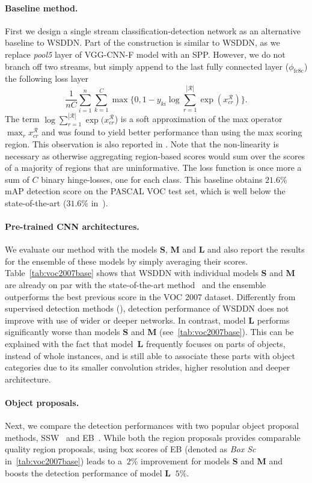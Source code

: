 \paragraph{Baseline method.} First we design a single stream classification-detection network as an alternative baseline to WSDDN. Part of the construction is similar to WSDDN, as we replace \textit{pool5} layer of VGG-CNN-F model with an SPP. However, we do not branch off two streams, but simply append to the last fully connected layer ($\phi_\text{fc8c}$) the following loss layer \[
\frac{1}{nC}
\sum_{i=1}^n
\sum_{k=1}^C
\max\{0, 1 - y_{ki} \log \sum_{r=1}^{|\mathcal{R}|} \exp(x^{\mathcal{R}}_{cr})\}.
\]
The term $\log \sum_{r=1}^{|\mathcal{R}|} \exp(x^{\mathcal{R}}_{cr}$) is a soft approximation of the max operator $\max_r x_{cr}^\mathcal{R}$ and was found to yield better performance than using the max scoring region. This observation is also reported in \cite{Bilen14}. Note that the non-linearity is necessary as otherwise aggregating region-based scores would sum over the scores of a majority of regions that are uninformative. The loss function is once more a sum of $C$ binary hinge-losses, one for each class. This baseline obtains $21.6 \%$ mAP detection score on the PASCAL VOC test set, which is well below the state-of-the-art ($31.6 \%$ in~\cite{Wang14a}).

\paragraph{Pre-trained CNN architectures.} We evaluate our method with the models \textbf{S}, \textbf{M} and \textbf{L} and also report the results for the ensemble of these models by simply averaging their scores. Table~\ref{tab:voc2007base} shows that WSDDN with individual models \textbf{S} and \textbf{M} are already on par with the state-of-the-art method~\cite{Wang14a} and the ensemble outperforms the best previous score in the VOC 2007 dataset. Differently from supervised detection methods (\eg \cite{Girshick15}), detection performance of WSDDN does not improve with use of wider or deeper networks. In contrast, model \textbf{L} performs significantly worse than models \textbf{S} and \textbf{M} (see~\cref{tab:voc2007base}). This can be explained with the fact that model~\textbf{L} frequently focuses on parts of objects, instead of whole instances, and is still able to associate these parts with object categories due to its smaller convolution strides, higher resolution and deeper architecture.

\paragraph{Object proposals.} Next, we compare the detection performances with two popular object proposal methods, SSW~\cite{Sande11} and EB~\cite{Zitnick14}. While both the region proposals provides comparable quality region proposals, using box scores of EB (denoted as \emph{Box Sc} in~\cref{tab:voc2007base}) leads to a $~2\%$ improvement for models \textbf{S} and \textbf{M} and boosts the detection performance of model \textbf{L} $~5\%$.

